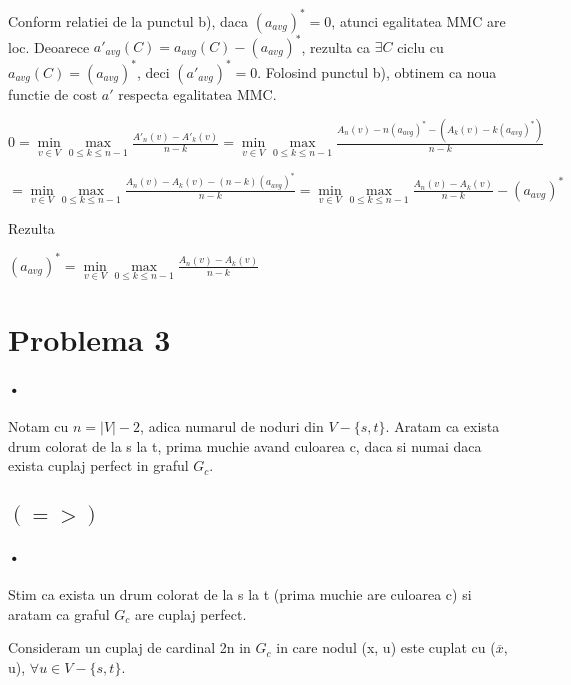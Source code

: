 \documentclass[paper=a4, fontsize=11pt]{scrartcl}
\begin{document}
Conform relatiei de la punctul b), daca $(a_{avg})^* = 0$, atunci egalitatea MMC are loc. Deoarece ${a'}_{avg}(C) = a_{avg}(C) - (a_{avg})^*$, rezulta ca $\exists C$ ciclu cu $a_{avg}(C) = (a_{avg})^*$, deci $({a'}_{avg})^* = 0$. Folosind punctul b), obtinem ca noua functie de cost $a'$ respecta egalitatea MMC.

\begin{center}
$0 = \min\limits_{v \in V} \max\limits_{0 \leqslant k \leqslant n-1} \frac{{A'}_n(v) - {A'}_k(v)}{n - k}= \min\limits_{v \in V} \max\limits_{0 \leqslant k \leqslant n-1} \frac{A_n(v) - n(a_{avg})^* - (A_k(v) - k(a_{avg})^*)}{n - k}$
\end{center}

\begin{center}
$= \min\limits_{v \in V} \max\limits_{0 \leqslant k \leqslant n-1} \frac{A_n(v) - A_k(v) - (n - k)(a_{avg})^*}{n - k}= \min\limits_{v \in V} \max\limits_{0 \leqslant k \leqslant n-1} \frac{A_n(v) - A_k(v)}{n - k} - (a_{avg})^*$
\end{center}

Rezulta
\begin{center}
$(a_{avg})^* = \min\limits_{v \in V} \max\limits_{0 \leqslant k \leqslant n-1} \frac{A_n(v) - A_k(v)}{n - k}$
\end{center}

\newpage
\section{Problema 3}

\paragraph{•}
Notam cu $n=\left| V \right| - 2$, adica numarul de noduri din $V-\{s, t\}$.
Aratam ca exista drum colorat de la s la t, prima muchie avand culoarea c, daca si numai daca exista cuplaj perfect in graful $G_c$.

\subsection{$(=>)$}
\paragraph{•}
Stim ca exista un drum colorat de la s la t (prima muchie are culoarea c) si aratam ca graful $G_c$ are cuplaj perfect.

Consideram un cuplaj de cardinal 2n in $G_c$ in care nodul (x, u) este cuplat cu ($\overline{x}$, u), $\forall u \in V-\{s, t\}$.
\end{document}
